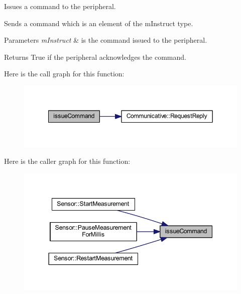 Issues a command to the peripheral. 

Sends a command which is an element of the m\+Instruct type. 
\begin{DoxyParams}{Parameters}
{\em m\+Instruct} & is the command issued to the peripheral. \\
\hline
\end{DoxyParams}
\begin{DoxyReturn}{Returns}
True if the peripheral acknowledges the command. 
\end{DoxyReturn}
Here is the call graph for this function\+:
\nopagebreak
\begin{figure}[H]
\begin{center}
\leavevmode
\includegraphics[width=349pt]{class_instructable_a26afb4fb25fe8a13e268544d0850fe3f_cgraph}
\end{center}
\end{figure}
Here is the caller graph for this function\+:
\nopagebreak
\begin{figure}[H]
\begin{center}
\leavevmode
\includegraphics[width=344pt]{class_instructable_a26afb4fb25fe8a13e268544d0850fe3f_icgraph}
\end{center}
\end{figure}
\mbox{\label{class_instructable_ae1de225deda4decc52ce8e06efa8c547}} 
